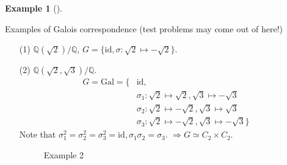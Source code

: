 \documentclass{article}
\theoremstyle{definition}
\newtheorem{ex}{Example}
\newenvironment{exs}[1][]{%
  \begin{ex}[#1]$ $\par\nobreak\ignorespaces
}{%
  \end{ex}
}
\newcommand{\QQ}{\mathbb Q}
\newcommand{\Ra}{\Rightarrow}
\begin{document}
\begin{exs}
	Examples of Galois correspondence (test problems may come out of here!)
	\begin{enumerate}
		\item[(1)] $\QQ(\sqrt{2})/\QQ$, $G = \{\text{id}, \sigma:\sqrt{2} \mapsto -\sqrt{2}\}$.
				

		\item[(2)] $\QQ(\sqrt{2}, \sqrt{3})/\QQ$.
			\[
				\begin{split}
					G = \text{Gal} = \{&\text{id},\\
					& \sigma_1: \sqrt{2} \mapsto \sqrt{2}, \sqrt{3} \mapsto - \sqrt{3}\\
					& \sigma_2: \sqrt{2} \mapsto - \sqrt{2}, \sqrt{3} \mapsto \sqrt{3}\\
					& \sigma_3: \sqrt{2} \mapsto -\sqrt{2}, \sqrt{3} \mapsto -\sqrt{3}\}
				\end{split}
			\]
			Note that $\sigma_1^2 = \sigma_2^2 = \sigma_3^2 = \text{id}, \sigma_1 \sigma_2 = \sigma_3$.
			$\Ra G \simeq C_2 \times C_2$.

				\begin{figure}[H]
					\centering
					\caption{Example 2}
				\end{figure}


\end{enumerate}
\end{exs}
\end{document}
